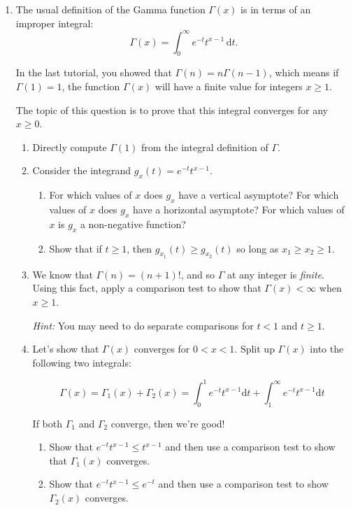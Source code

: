 \begin{enumerate}
\item The usual definition of the Gamma function $\Gamma(x)$ is in terms of an improper integral: 
\[
        \Gamma(x) = \int_0^\infty e^{-t}t^{x-1}\,\mathrm dt.
    \]

In the last tutorial, you showed that $\Gamma(n)=n\Gamma(n-1)$, which means if $\Gamma(1)=1$, the function $\Gamma(x)$ will have a finite value for integers $x\geq 1$.


The topic of this question is to prove that this integral converges for any $x\geq0$. 

\begin{enumerate}
    \item Directly compute $\Gamma(1)$ from the integral definition of $\Gamma$.

    \item Consider the integrand $g_x(t)=e^{-t}t^{x-1}$.
    
    \begin{enumerate}
        \item For which values of $x$ does $g_x$ have a vertical asymptote? For which values of $x$ does $g_x$ have a horizontal asymptote?
        For which values of $x$ is $g_x$ a non-negative function?
        \item Show that if $t\geq 1$, then $g_{x_1}(t) \geq g_{x_2}(t)$ so
        long as $x_1\geq x_2\geq 1$.
    \end{enumerate}

    \item We know that $\Gamma(n) = (n+1)!$, and so $\Gamma$ at any integer is
     \emph{finite}. Using this fact, apply a comparison test to show that
      $\Gamma(x)<\infty$ when $x\geq1$.

      \emph{Hint:} You may need to do separate comparisons for $t<1$ and $t\geq 1$.
    
    \item Let's show that $\Gamma(x)$ converges for $0<x<1$. Split up $\Gamma(x)$ into the following two integrals:

    \[\Gamma(x) = \Gamma_1(x) + \Gamma_2(x) = \int_0^1 e^{-t}t^{x-1}\mathrm dt + \int_1^\infty e^{-t}t^{x-1}\mathrm dt\]

    If both $\Gamma_1$ and $\Gamma_2$ converge, then we're good!

    \begin{enumerate}
        \item Show that $e^{-t}t^{x-1} \leq t^{x-1}$ and then 
        use a comparison test to show that $\Gamma_1(x)$ converges. 
        \item Show that $e^{-t}t^{x-1} \leq e^{-t}$ and then use a comparison test to show $\Gamma_2(x)$ converges.
    \end{enumerate}

    
\end{enumerate}



\end{enumerate}

